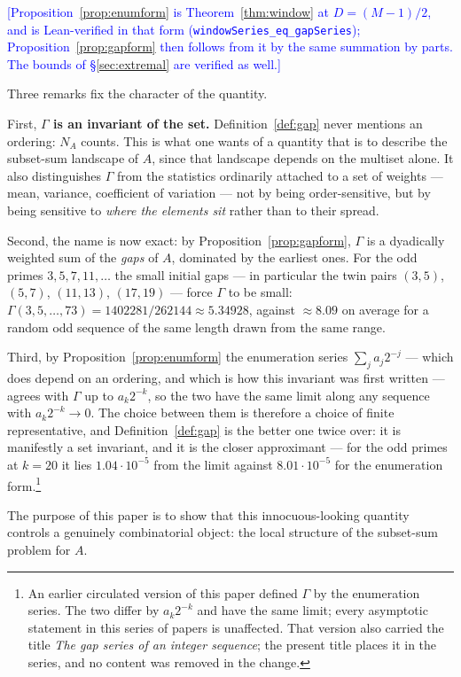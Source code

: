 \documentclass[11pt,a4paper]{article}
\theoremstyle{plain}
\theoremstyle{definition}
\theoremstyle{remark}
\newcommand{\Lean}[1]{\texttt{#1}}
\newcommand{\STATUS}[1]{\textcolor{blue}{\textsf{[#1]}}}
\begin{document}
\STATUS{Proposition~\ref{prop:enumform} is Theorem~\ref{thm:window} at
$D=(M-1)/2$, and is Lean-verified in that form
(\Lean{windowSeries\_eq\_gapSeries}); Proposition~\ref{prop:gapform} then follows
from it by the same summation by parts. The bounds of \S\ref{sec:extremal} are
verified as well.}

Three remarks fix the character of the quantity.

First, \textbf{$\Gamma$ is an invariant of the set.} Definition~\ref{def:gap} never
mentions an ordering: $N_A$ counts. This is what one wants of a quantity that
is to describe the subset-sum landscape of $A$, since that landscape depends on
the multiset alone. It also distinguishes $\Gamma$ from the statistics
ordinarily attached to a set of weights --- mean, variance, coefficient of
variation --- not by being order-sensitive, but by being sensitive to
\emph{where the elements sit} rather than to their spread.

Second, the name is now exact: by Proposition~\ref{prop:gapform}, $\Gamma$ is a
dyadically weighted sum of the \emph{gaps} of $A$, dominated by the earliest
ones. For the odd primes $3,5,7,11,\dots$ the small initial gaps --- in
particular the twin pairs $(3,5)$, $(5,7)$, $(11,13)$, $(17,19)$ --- force
$\Gamma$ to be small: $\Gamma(3,5,\dots,73)=1402281/262144\approx5.34928$,
against $\approx8.09$ on average for a random odd sequence of the same length
drawn from the same range.

Third, by Proposition~\ref{prop:enumform} the enumeration series
$\sum_ja_j2^{-j}$ --- which does depend on an ordering, and which is how this
invariant was first written --- agrees with $\Gamma$ up to $a_k2^{-k}$, so the
two have the same limit along any sequence with $a_k2^{-k}\to0$. The choice
between them is therefore a choice of finite representative, and
Definition~\ref{def:gap} is the better one twice over: it is manifestly a set
invariant, and it is the closer approximant --- for the odd primes at $k=20$ it
lies $1.04\cdot10^{-5}$ from the limit against $8.01\cdot10^{-5}$ for the
enumeration form.\footnote{An earlier circulated version of this paper defined
$\Gamma$ by the enumeration series. The two differ by $a_k2^{-k}$ and have the
same limit; every asymptotic statement in this series of papers is unaffected.
That version also carried the title \emph{The gap series of an integer sequence};
the present title places it in the series, and no content was removed in the
change.}

The purpose of this paper is to show that this innocuous-looking quantity
controls a genuinely combinatorial object: the local structure of the
subset-sum problem for $A$.
\end{document}
